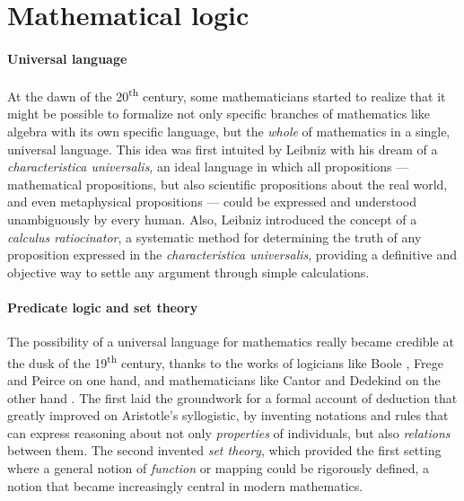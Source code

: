 \section{Mathematical logic}

\paragraph{Universal language}

At the dawn of the 20\textsuperscript{th} century, some mathematicians started
to realize that it might be possible to formalize not only specific branches of
mathematics like algebra with its own specific language, but the \emph{whole} of
mathematics in a single, universal language. This idea was first intuited by
Leibniz with his dream of a \textit{characteristica universalis}, an ideal
language in which all propositions --- mathematical propositions, but also
scientific propositions about the real world, and even metaphysical propositions
--- could be expressed and understood unambiguously by every human. Also,
Leibniz introduced the concept of a \textit{calculus ratiocinator}, a systematic
method for determining the truth of any proposition expressed in the
\textit{characteristica universalis}, providing a definitive and objective way
to settle any argument through simple calculations.

\paragraph{Predicate logic and set theory}

The possibility of a universal language for mathematics really became credible
at the dusk of the 19\textsuperscript{th} century, thanks to the works of
logicians like Boole , Frege  and
Peirce  on one hand, and mathematicians like
Cantor and Dedekind on the other hand
. The first laid the groundwork
for a formal account of deduction that greatly improved on Aristotle's
syllogistic, by inventing notations and rules that can express reasoning about
not only \emph{properties} of individuals, but also \emph{relations} between
them. The second invented \emph{set theory}, which provided the first setting
where a general notion of \emph{function} or mapping could be rigorously
defined, a notion that became increasingly central in modern mathematics.

